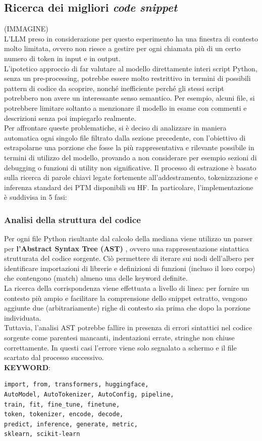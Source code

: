 \documentclass{article}
\begin{document}
\subsection{Ricerca dei migliori \textit{code snippet}}
(IMMAGINE)\\
L'LLM preso in considerazione per questo esperimento ha una finestra di contesto molto limitata, ovvero non riesce a gestire per ogni chiamata più di un certo numero di token in input e in output.\\
L'ipotetico approccio di far valutare al modello direttamente interi script Python, senza un pre-processing, potrebbe essere molto restrittivo in termini di possibili pattern di codice da scoprire, nonché inefficiente perché gli stessi script potrebbero non avere un interessante senso semantico. Per esempio, alcuni file, si potrebbere limitare soltanto a menzionare il modello in esame con commenti e descrizioni senza poi impiegarlo realmente.\\
Per affrontare queste problematiche, si è deciso di analizzare in maniera automatica ogni singolo file filtrato dalla sezione precedente, con l'obiettivo di estrapolarne una porzione che fosse la più rappresentativa e rilevante possibile in termini di utilizzo del modello, provando a non considerare per esempio sezioni di debugging o funzioni di utility non significative. Il processo di estrazione è basato sulla ricerca di parole chiavi legate fortemente all'addestramento, tokenizzazione e inferenza standard dei PTM disponibili su HF. In particolare, l'implementazione è suddivisa in 5 fasi:\\
\subsubsection{Analisi della struttura del codice}
Per ogni file Python risultante dal calcolo della mediana viene utilizzo un parser per \textbf{l'Abstract Syntax Tree (AST)} \cite{python_ast}, ovvero una rappresentazione sintattica strutturata del codice sorgente. Ciò permettere di iterare sui nodi dell'albero per identificare importazioni di librerie e definizioni di funzioni (incluso il loro corpo) che contengono (match) almeno una delle keyword definite. \\
La ricerca della corrispondenza viene effettuata a livello di linea: per fornire un contesto più ampio e facilitare la comprensione dello snippet estratto, vengono aggiunte due (arbitrariamente) righe di contesto sia prima che dopo la porzione individuata.\\
Tuttavia, l’analisi AST potrebbe fallire in presenza di errori sintattici nel codice sorgente come parentesi mancanti, indentazioni errate, stringhe non chiuse correttamente. In questi casi l'errore viene solo segnalato a schermo e il file scartato dal processo successivo.\\
\textbf{KEYWORD}:
\lstset{basicstyle=\ttfamily, columns=flexible}
\begin{lstlisting}
import, from, transformers, huggingface, 
AutoModel, AutoTokenizer, AutoConfig, pipeline,
train, fit, fine_tune, finetune,
token, tokenizer, encode, decode,
predict, inference, generate, metric,
sklearn, scikit-learn
\end{lstlisting}
    
\end{document}
